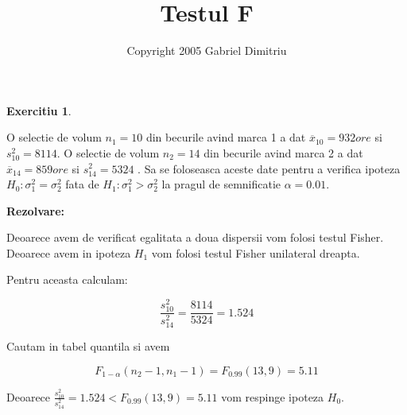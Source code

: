 \documentclass{article}
\newtheorem{exercise}[theorem]{Exercitiu}
\begin{document}
\title{Testul F}
\author{Copyright 2005 Gabriel Dimitriu}
\maketitle

\begin{exercise}
\bigskip
\end{exercise}

O selectie de volum $n_{1}=10$ din becurile avind marca 1 a dat $\overline{x}%
_{10}=932ore$ si $s_{10}^{2}=8114$. O selectie de volum $n_{2}=14$ din
becurile avind marca 2 a dat $\overline{x}_{14}=859ore$ si $s_{14}^{2}=5324$%
. Sa se foloseasca aceste date pentru a verifica ipoteza $H_{0}:\sigma
_{1}^{2}=\sigma _{2}^{2}$ fata de $H_{1}:\sigma _{1}^{2}>\sigma _{2}^{2}$ la
pragul de semnificatie $\alpha =0.01$.

\textbf{Rezolvare:}

Deoarece avem de verificat egalitata a doua dispersii vom folosi testul
Fisher. Deoarece avem \TEXTsymbol{>} in ipoteza $H_{1}$ vom folosi testul
Fisher unilateral dreapta.

Pentru aceasta calculam:

\[
\frac{s_{10}^{2}}{s_{14}^{2}}=\frac{8114}{5324}=1.524 
\]

Cautam in tabel quantila si avem

\[
F_{1-\alpha }(n_{2}-1,n_{1}-1)=F_{0.99}(13,9)=5.11 
\]

Deoarece $\frac{s_{10}^{2}}{s_{14}^{2}}=1.524<F_{0.99}(13,9)=5.11$ vom
respinge ipoteza $H_{0}$.
\end{document}
